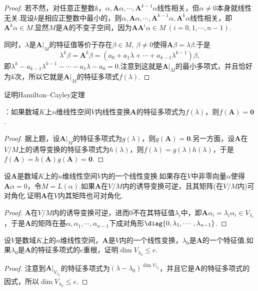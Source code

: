 \begin{proof}
	若不然，对任意正整数$k$，$\alpha,\bm A\alpha,\cdots,\bm A^{k-1}\alpha$线性相关，但$\alpha\ne0$本身就线性无关.现设$k$是相应正整数中最小的，则$\alpha,\bm A\alpha,\cdots,\bm A^{k-1}\alpha,\bm A^k\alpha$线性相关，即$\bm A^k\alpha\in M$.显然$M$是$\bm A$的不变子空间，因为$\bm A\bm A^i\alpha\in M\ (i=0,1,\cdots,n-1)$.

	同时，$\lambda$是$\bm A|_M$的特征值等价于存在$\beta\in M,\ \beta\ne0$使得$\bm A\beta=\lambda\beta$.于是
	\[
		\lambda^k\beta=\bm A^k\beta=(a_0+a_1\lambda+\cdots+a_{k-1}\lambda^{k-1})\beta,
	\]
	即$\lambda^k-a_{k-1}\lambda^{k-1}-\cdots-a_1\lambda-a_0=0$.注意到这就是$\bm A|_M$的最小多项式，并且恰好为$k$次，所以它就是$\bm A|_M$的特征多项式$f(\lambda)$.
\end{proof}
\begin{prob}[25]
	\hypertarget{Hamilton-Cayley}{证明Hamilton--Cayley定理}：如果数域$K$上$n$维线性空间$V$内线性变换$\bm A$的特征多项式为$f(\lambda)$，则$f(\bm A)=\bm 0$.
\end{prob}
\begin{proof}
	据上题，设$\bm A|_M$的特征多项式为$g(\lambda)$，则$g(\bm A)=\bm 0$.另一方面，设$\bm A$在$V/M$上的诱导变换的特征多项式为$h(\lambda)$，则$f(\lambda)=g(\lambda)h(\lambda)$，于是$f(\bm A)=h(\bm A)g(\bm A)=\bm 0$.
\end{proof}
\begin{prob}[26]
	设$\bm A$是数域$K$上的$n$维线性空间$V$内的一个线性变换.如果存在$V$中非零向量$\alpha$使得$\bm A\alpha=0$，令$M=L(\alpha)$.如果$\bm A$在$V/M$内的诱导变换可逆，且其矩阵(在$V/M$内)可对角化.证明$\bm A$在$V$内其矩阵也可对角化.
\end{prob}
\begin{proof}
	$\bm A$在$V/M$内的诱导变换可逆，进而$0$不在其特征值$\lambda_i$中，即$\bm A\alpha_i=\lambda_i\alpha_i\in V_{\lambda_i}$，于是$\bm A$的矩阵在基$\alpha,\alpha_1,\cdots,\alpha_{n-1}$下成对角形$\diag{0,\lambda_1,\cdots,\lambda_{n-1}}$.
\end{proof}
\begin{prob}[27]
	设$V$是数域$K$上的$n$维线性空间，$\bm A$是$V$内的一个线性变换，$\lambda_0$是$\bm A$的一个特征值.如果$\lambda_0$是$\bm A$的特征多项式的$e$重根，证明$\dim V_{\lambda_0}\le e$.
\end{prob}
\begin{proof}
	注意到$\bm A|_{V_{\lambda_0}}$的特征多项式为$(\lambda-\lambda_0)^{\dim V_{\lambda_0}}$，并且它是$\bm A$的特征多项式的因式，所以$\dim V_{\lambda_0}\le e$.
\end{proof}
